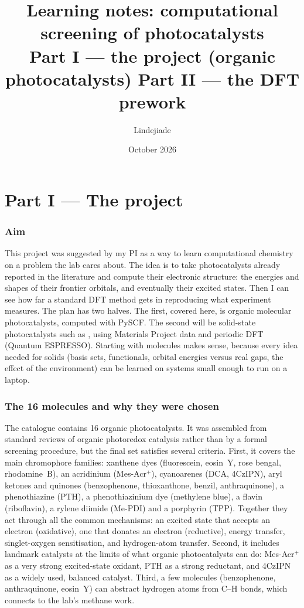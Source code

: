 \documentclass[11pt,a4paper]{article}
\title{Learning notes: computational screening of photocatalysts\\[3pt]
\large Part I --- the project (organic photocatalysts) \quad Part II --- the DFT prework}
\author{Lindejiade}
\date{October 2026}
\begin{document}
\maketitle
\tableofcontents

\part*{Part I --- The project}

\section{Aim}

This project was suggested by my PI as a way to learn computational chemistry on a problem the lab
cares about. The idea is to take photocatalysts already reported in the literature and compute their
electronic structure: the energies and shapes of their frontier orbitals, and eventually their
excited states. Then I can see how far a standard DFT method gets in reproducing what experiment
measures. The plan has two halves. The first, covered here, is organic molecular photocatalysts,
computed with PySCF. The second will be solid-state photocatalysts such as , using
Materials Project data and periodic DFT (Quantum ESPRESSO). Starting with molecules makes sense,
because every idea needed for solids (basis sets, functionals, orbital energies versus real gaps,
the effect of the environment) can be learned on systems small enough to run on a laptop.

\section{The 16 molecules and why they were chosen}

The catalogue contains 16 organic photocatalysts. It was assembled from standard reviews of organic
photoredox catalysis rather than by a formal screening procedure, but the final set satisfies
several criteria. First, it covers the main chromophore families: xanthene dyes (fluorescein,
eosin~Y, rose bengal, rhodamine~B), an acridinium (Mes-Acr$^+$), cyanoarenes (DCA, 4CzIPN), aryl
ketones and quinones (benzophenone, thioxanthone, benzil, anthraquinone), a phenothiazine (PTH), a
phenothiazinium dye (methylene blue), a flavin (riboflavin), a rylene diimide (Me-PDI) and a
porphyrin (TPP). Together they act through all the common mechanisms: an excited state that accepts
an electron (oxidative), one that donates an electron (reductive), energy transfer, singlet-oxygen
sensitisation, and hydrogen-atom transfer. Second, it includes landmark catalysts at the limits of
what organic photocatalysts can do: Mes-Acr$^+$ as a very strong excited-state oxidant, PTH as a
strong reductant, and 4CzIPN as a widely used, balanced catalyst. Third, a few molecules
(benzophenone, anthraquinone, eosin~Y) can abstract hydrogen atoms from C--H bonds, which connects
to the lab's methane work.
\end{document}
